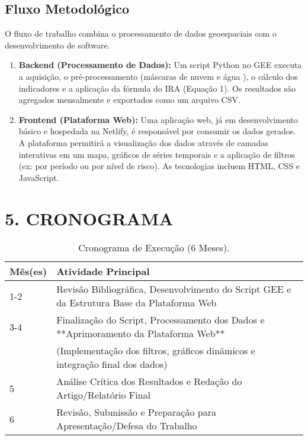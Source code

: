 \documentclass[12pt, a4paper]{article}
\begin{document}
\subsection{Fluxo Metodológico}
O fluxo de trabalho combina o processamento de dados geoespaciais com o desenvolvimento de software.
\begin{enumerate}
    \item \textbf{Backend (Processamento de Dados):} Um script Python no GEE executa a aquisição, o pré-processamento (máscaras de nuvem e água \cite{mcfeeters1996}), o cálculo dos indicadores \cite{londe2013, nechad2010} e a aplicação da fórmula do IRA (Equação 1). Os resultados são agregados mensalmente e exportados como um arquivo CSV.
    \item \textbf{Frontend (Plataforma Web):} Uma aplicação web, já em desenvolvimento básico e hospedada na Netlify, é responsável por consumir os dados gerados. A plataforma permitirá a visualização dos dados através de camadas interativas em um mapa, gráficos de séries temporais e a aplicação de filtros (ex: por período ou por nível de risco). As tecnologias incluem HTML, CSS e JavaScript.
\end{enumerate}

\section*{5. CRONOGRAMA}
\begin{table}[h!]
\centering
\caption{Cronograma de Execução (6 Meses).}
\label{tab:cronograma}
\begin{tabular}{ll}
\toprule
\textbf{Mês(es)} & \textbf{Atividade Principal} \\ 
\midrule
1-2 & Revisão Bibliográfica, Desenvolvimento do Script GEE e da Estrutura Base da Plataforma Web \\
3-4 & Finalização do Script, Processamento dos Dados e **Aprimoramento da Plataforma Web** \\
    & (Implementação dos filtros, gráficos dinâmicos e integração final dos dados) \\
5   & Análise Crítica dos Resultados e Redação do Artigo/Relatório Final \\
6   & Revisão, Submissão e Preparação para Apresentação/Defesa do Trabalho \\
\bottomrule
\end{tabular}
\end{table}
\end{document}
